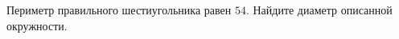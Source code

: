 \begin{ex}
	\begin{condition}
		Периметр правильного шестиугольника равен \( 54 \). Найдите диаметр описанной окружности.
	\end{condition}
\end{ex}